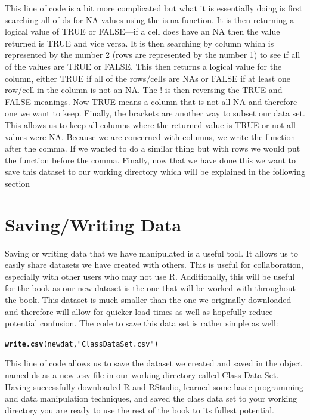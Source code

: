 \documentclass[11pt,openany]{book}\usepackage[]{graphicx}\usepackage[]{color}
\makeatletter
\newcommand{\hlstr}[1]{\textcolor[rgb]{0.192,0.494,0.8}{#1}}%
\newcommand{\hlstd}[1]{\textcolor[rgb]{0.345,0.345,0.345}{#1}}%
\newcommand{\hlkwd}[1]{\textcolor[rgb]{0.737,0.353,0.396}{\textbf{#1}}}%
\newenvironment{kframe}{%
 \def\at@end@of@kframe{}%
 \ifinner\ifhmode%
  \def\at@end@of@kframe{\end{minipage}}%
  \begin{minipage}{\columnwidth}%
 \fi\fi%
 \def\FrameCommand##1{\hskip\@totalleftmargin \hskip-\fboxsep
 \colorbox{shadecolor}{##1}\hskip-\fboxsep
     \hskip-\linewidth \hskip-\@totalleftmargin \hskip\columnwidth}%
 \MakeFramed {\advance\hsize-\width
   \@totalleftmargin\z@ \linewidth\hsize
   \@setminipage}}%
 {\par\unskip\endMakeFramed%
 \at@end@of@kframe}
\newenvironment{knitrout}{}{} %
\renewenvironment{knitrout}{\begin{singlespace}}{\end{singlespace}}
\makeatother
\begin{document}
This line of code is a bit more complicated but what it is essentially doing is first searching all of ds for NA values using the is.na function. It is then returning a logical value of TRUE or FALSE---if a cell does have an NA then the value returned is TRUE and vice versa. It is then searching by column which is represented by the number 2 (rows are represented by the number 1) to see if all of the values are TRUE or FALSE. This then returns a logical value for the column, either TRUE if all of the rows/cells are NAs or FALSE if at least one row/cell in the column is not an NA. The ! is then reversing the TRUE and FALSE meanings. Now TRUE means a column that is not all NA and therefore one we want to keep. Finally, the brackets are another way to subset our data set. This allows us to keep all columns where the returned value is TRUE or not all values were NA. Because we are concerned with columns, we write the function after the comma. If we wanted to do a similar thing but with rows we would put the function before the comma. Finally, now that we have done this we want to save this dataset to our working directory which will be explained in the following section

\section{Saving/Writing Data}

Saving or writing data that we have manipulated is a useful tool. It allows us to easily share datasets we have created with others. This is useful for collaboration, especially with other users who may not use R. Additionally, this will be useful for the book as our new dataset is the one that will be worked with throughout the book. This dataset is much smaller than the one we originally downloaded and therefore will allow for quicker load times as well as hopefully reduce potential confusion. The code to save this data set is rather simple as well:

\begin{knitrout}
\color{fgcolor}\begin{kframe}
\begin{alltt}
\hlkwd{write.csv}\hlstd{(newdat,} \hlstr{"Class Data Set.csv"}\hlstd{)}
\end{alltt}
\end{kframe}
\end{knitrout}

This line of code allows us to save the dataset we created and saved in the object named ds as a new .csv file in our working directory called Class Data Set. Having successfully downloaded R and RStudio, learned some basic programming and data manipulation techniques, and saved the class data set to your working directory you are ready to use the rest of the book to its fullest potential.  
\end{document}
